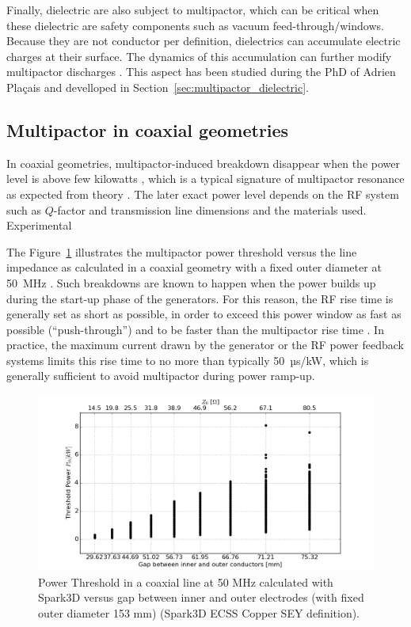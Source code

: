 Finally, dielectric are also subject to multipactor, which can be critical when these dielectric are safety components such as vacuum feed-through/windows. Because they are not conductor per definition, dielectrics can accumulate electric charges at their surface. The dynamics of this accumulation can further modify multipactor discharges . This aspect has been studied during the PhD of Adrien Plaçais  and develloped in Section~\ref{sec:multipactor_dielectric}.


\subsection{Multipactor in coaxial geometries}\label{sec:multipactor_icrf}
In coaxial geometries, multipactor-induced breakdown disappear when the power level is above few kilowatts , which is a typical signature of multipactor resonance as expected from theory  . The later exact power level depends on the RF system such as $Q$-factor and transmission line dimensions and the materials used. Experimental 

The Figure~\ref{fig:powerthresholdcoax} illustrates the multipactor power threshold versus the line impedance as calculated in a coaxial geometry with a fixed outer diameter at 50~MHz . Such breakdowns are known to happen when the power builds up during the start-up phase of the generators. For this reason, the RF rise time is generally set as short as possible, in order to exceed this power window as fast as possible (“push-through”) and to be faster than the multipactor rise time . In practice, the maximum current drawn by the generator or the RF power feedback systems limits this rise time to no more than typically 50~µs/kW, which is generally sufficient to avoid multipactor during power ramp-up. 

\begin{figure}[h]
	\centering
	\includegraphics[width=1.0\linewidth]{figures/chap4/power_threshold_coax}
	\caption{Power Threshold in a coaxial line at 50 MHz calculated with Spark3D versus gap between inner and outer electrodes (with fixed outer diameter 153 mm) (Spark3D ECSS Copper SEY definition).}
	\label{fig:powerthresholdcoax}
\end{figure}





